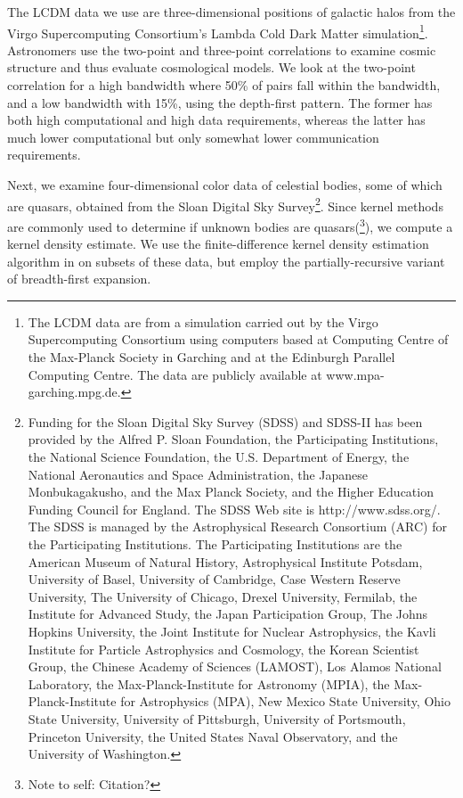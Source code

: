 \documentclass[twoside,leqno,twocolumn]{article}
\newcommand{\authornote}[1]{(\footnote{Note to self: #1})}
\newcommand{\authorsnote}[1]{\authornote{#1}}
\begin{document}
The LCDM data we use are three-dimensional positions of galactic halos from the Virgo Supercomputing Consortium's Lambda Cold Dark Matter simulation\footnote{
    The LCDM data are from a simulation carried out by the Virgo Supercomputing Consortium using computers based at Computing Centre of the Max-Planck Society in Garching and at the Edinburgh Parallel Computing Centre.
    The data are publicly available at www.mpa-garching.mpg.de.}.
Astronomers use the two-point and three-point correlations to examine cosmic structure and thus evaluate cosmological models.
We look at the two-point correlation for a high bandwidth where 50\% of pairs fall within the bandwidth, and a low bandwidth with 15\%, using the depth-first pattern.
The former has both high computational and high data requirements, whereas the latter has much lower computational but only somewhat lower communication requirements.

Next, we examine four-dimensional color data of celestial bodies, some of which are quasars, obtained from the Sloan Digital Sky Survey\footnote{
  Funding for the Sloan Digital Sky Survey (SDSS) and SDSS-II has been provided by the Alfred P. Sloan Foundation, the Participating Institutions, the National Science Foundation, the U.S. Department of Energy, the National Aeronautics and Space Administration, the Japanese Monbukagakusho, and the Max Planck Society, and the Higher Education Funding Council for England.
  The SDSS Web site is http://www.sdss.org/.
  The SDSS is managed by the Astrophysical Research Consortium (ARC) for the Participating Institutions.
  The Participating Institutions are the American Museum of Natural History, Astrophysical Institute Potsdam, University of Basel, University of Cambridge, Case Western Reserve University, The University of Chicago, Drexel University, Fermilab, the Institute for Advanced Study, the Japan Participation Group, The Johns Hopkins University, the Joint Institute for Nuclear Astrophysics, the Kavli Institute for Particle Astrophysics and Cosmology, the Korean Scientist Group, the Chinese Academy of Sciences (LAMOST), Los Alamos National Laboratory, the Max-Planck-Institute for Astronomy (MPIA), the Max-Planck-Institute for Astrophysics (MPA), New Mexico State University, Ohio State University, University of Pittsburgh, University of Portsmouth, Princeton University, the United States Naval Observatory, and the University of Washington.
}.
Since kernel methods are commonly used to determine if unknown bodies are quasars\authorsnote{Citation?}, we compute a kernel density estimate.
We use the finite-difference kernel density estimation algorithm in \cite{gray_kde} on subsets of these data, but employ the partially-recursive variant of breadth-first expansion.
\end{document}
